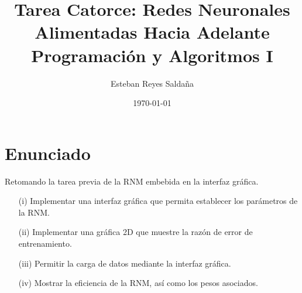 \documentclass[12pt,letterpaper]{article}
\title{ \textbf{Tarea Catorce: Redes Neuronales Alimentadas Hacia Adelante} \\ Programación y Algoritmos I}
\author{Esteban Reyes Saldaña}
\date{\today}
\theoremstyle{definition}
\theoremstyle{definition}
\theoremstyle{definition}
\theoremstyle{definition}
\theoremstyle{definition}
\theoremstyle{definition}
\begin{document}
	
	\maketitle 
	\section*{Enunciado}
	Retomando la tarea previa de la RNM
	embebida en la interfaz gráfica.
	\begin{itemize}
		\item[(i)] Implementar una interfaz gráfica que permita establecer los parámetros de la RNM.
		\item[(ii)] Implementar una gráfica 2D que muestre la razón de error de entrenamiento.
		\item[(iii)] Permitir la carga de datos mediante la interfaz gráfica.
		\item[(iv)] Mostrar la eficiencia de la RNM, así como los pesos asociados.
	\end{itemize}
	
	
\end{document}
